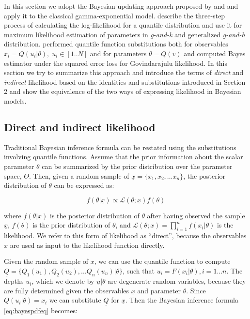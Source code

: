 \documentclass[
  12pt,
]{article}
\begin{document}
In this section we adopt the Bayesian updating approach proposed by \citet{rayner2002NumericalMaximumLikelihood} and \citet{nair2020BayesianInferenceQuantile} and apply it to the classical gamma-exponential model. \citet{rayner2002NumericalMaximumLikelihood} describe the three-step process of calculating the log-likelihood for a quantile distribution and use it for maximum likelihood estimation of parameters in \emph{g-and-k} and generalized \emph{g-and-h} distribution. \citet{nair2020BayesianInferenceQuantile} performed quantile function substitutions both for observables \(x_i=Q(u_i|\theta), \; u_i \in [1..N]\) and for parameters \(\theta=Q(v)\) and computed Bayes estimator under the squared error loss for Govindarajulu likelihood. In this section we try to summarize this approach and introduce the terms of \emph{direct} and \emph{indirect} likelihood based on the identities and substitutions introduced in Section 2 and show the equivalence of the two ways of expressing likelihood in Bayesian models.

\hypertarget{direct-and-indirect-likelihood}{%
\subsection{Direct and indirect likelihood}\label{direct-and-indirect-likelihood}}

Traditional Bayesian inference formula can be restated using the substitutions involving quantile functions. Assume that the prior information about the scalar parameter \(\theta\) can be summarized by the prior distribution over the parameter space, \(\Theta\). Then, given a random sample of \(\underline x=\{x_1, x_2, \dots x_n\}\), the posterior distribution of \(\theta\) can be expressed as:

\[
f(\theta|\underline{x}) \propto \mathcal{L}(\theta;\underline{x})f(\theta)
\label{eq:bayespdfeq}
\]

where \(f(\theta|\underline{x})\) is the posterior distribution of \(\theta\) after having observed the sample \(\underline{x}\), \(f(\theta)\) is the prior distribution of \(\theta\), and \(\mathcal{L}(\theta;x)=\prod_{i=1}^{n}f(x_i|\theta)\) is the likelihood. We refer to this form of likelihood as ``direct'', because the observables \(x\) are used as input to the likelihood function directly.

Given the random sample of \(\underline x\), we can use the quantile function to compute \(\underline{Q}=\{Q_1(u_1), Q_2(u_2), \dots Q_n(u_n)|\theta\}\), such that \(u_i=F(x_i|\theta), i=1\dots n\). The depths \(u_i\), which we denote by \(\underline u|\theta\) are degenerate random variables, because they are fully determined given the observables \(\underline{x}\) and parameter \(\theta\). Since \(Q(u_i|\theta)=x_i\) we can substitute \(\underline Q\) for \(\underline x\). Then the Bayesian inference formula \eqref{eq:bayespdfeq} becomes:
\end{document}

